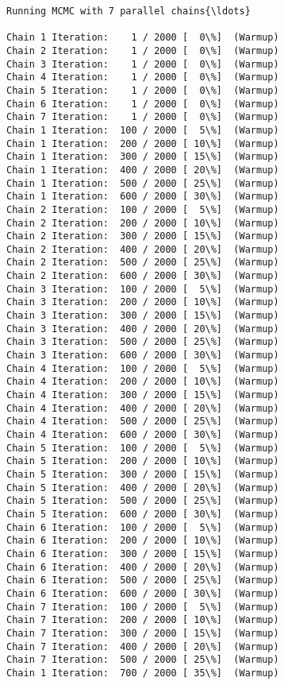 \documentclass[11pt]{article}
\begin{document}
    \begin{Verbatim}[commandchars=\\\{\}]
Running MCMC with 7 parallel chains{\ldots}

Chain 1 Iteration:    1 / 2000 [  0\%]  (Warmup)
Chain 2 Iteration:    1 / 2000 [  0\%]  (Warmup)
Chain 3 Iteration:    1 / 2000 [  0\%]  (Warmup)
Chain 4 Iteration:    1 / 2000 [  0\%]  (Warmup)
Chain 5 Iteration:    1 / 2000 [  0\%]  (Warmup)
Chain 6 Iteration:    1 / 2000 [  0\%]  (Warmup)
Chain 7 Iteration:    1 / 2000 [  0\%]  (Warmup)
Chain 1 Iteration:  100 / 2000 [  5\%]  (Warmup)
Chain 1 Iteration:  200 / 2000 [ 10\%]  (Warmup)
Chain 1 Iteration:  300 / 2000 [ 15\%]  (Warmup)
Chain 1 Iteration:  400 / 2000 [ 20\%]  (Warmup)
Chain 1 Iteration:  500 / 2000 [ 25\%]  (Warmup)
Chain 1 Iteration:  600 / 2000 [ 30\%]  (Warmup)
Chain 2 Iteration:  100 / 2000 [  5\%]  (Warmup)
Chain 2 Iteration:  200 / 2000 [ 10\%]  (Warmup)
Chain 2 Iteration:  300 / 2000 [ 15\%]  (Warmup)
Chain 2 Iteration:  400 / 2000 [ 20\%]  (Warmup)
Chain 2 Iteration:  500 / 2000 [ 25\%]  (Warmup)
Chain 2 Iteration:  600 / 2000 [ 30\%]  (Warmup)
Chain 3 Iteration:  100 / 2000 [  5\%]  (Warmup)
Chain 3 Iteration:  200 / 2000 [ 10\%]  (Warmup)
Chain 3 Iteration:  300 / 2000 [ 15\%]  (Warmup)
Chain 3 Iteration:  400 / 2000 [ 20\%]  (Warmup)
Chain 3 Iteration:  500 / 2000 [ 25\%]  (Warmup)
Chain 3 Iteration:  600 / 2000 [ 30\%]  (Warmup)
Chain 4 Iteration:  100 / 2000 [  5\%]  (Warmup)
Chain 4 Iteration:  200 / 2000 [ 10\%]  (Warmup)
Chain 4 Iteration:  300 / 2000 [ 15\%]  (Warmup)
Chain 4 Iteration:  400 / 2000 [ 20\%]  (Warmup)
Chain 4 Iteration:  500 / 2000 [ 25\%]  (Warmup)
Chain 4 Iteration:  600 / 2000 [ 30\%]  (Warmup)
Chain 5 Iteration:  100 / 2000 [  5\%]  (Warmup)
Chain 5 Iteration:  200 / 2000 [ 10\%]  (Warmup)
Chain 5 Iteration:  300 / 2000 [ 15\%]  (Warmup)
Chain 5 Iteration:  400 / 2000 [ 20\%]  (Warmup)
Chain 5 Iteration:  500 / 2000 [ 25\%]  (Warmup)
Chain 5 Iteration:  600 / 2000 [ 30\%]  (Warmup)
Chain 6 Iteration:  100 / 2000 [  5\%]  (Warmup)
Chain 6 Iteration:  200 / 2000 [ 10\%]  (Warmup)
Chain 6 Iteration:  300 / 2000 [ 15\%]  (Warmup)
Chain 6 Iteration:  400 / 2000 [ 20\%]  (Warmup)
Chain 6 Iteration:  500 / 2000 [ 25\%]  (Warmup)
Chain 6 Iteration:  600 / 2000 [ 30\%]  (Warmup)
Chain 7 Iteration:  100 / 2000 [  5\%]  (Warmup)
Chain 7 Iteration:  200 / 2000 [ 10\%]  (Warmup)
Chain 7 Iteration:  300 / 2000 [ 15\%]  (Warmup)
Chain 7 Iteration:  400 / 2000 [ 20\%]  (Warmup)
Chain 7 Iteration:  500 / 2000 [ 25\%]  (Warmup)
Chain 1 Iteration:  700 / 2000 [ 35\%]  (Warmup)

\end{Verbatim}
\end{document}
